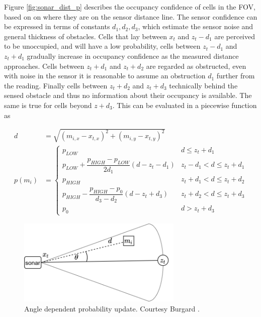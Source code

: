 Figure \ref{fig:sonar_dist_p} describes the occupancy confidence of cells in the FOV, based on on where they are on the sensor distance line. The sensor confidence can be expressed in terms of constants $d_1, d_2, d_3$, which estimate the sensor noise and general thickness of obstacles. Cells that lay between $x_t$ and $z_t-d_1$ are perceived to be unoccupied, and will have a low probability, cells between $z_t-d_1$ and $z_t+d_1$ gradually increase in occupancy confidence as the measured distance approaches. Cells between $z_t+d_1$ and $z_t+d_2$ are regarded as obstructed, even with noise in the sensor it is reasonable to assume an obstruction $d_1$ further from the reading. Finally cells between $z_t+d_2$ and $z_t+d_3$ technically behind the sensed obstacle and thus no information about their occupancy is available. The same is true for cells beyond $z+d_3$. This can be evaluated in a piecewise function as

\begin{align}
    d &= \sqrt{(m_{i,x} - x_{t,x})^2 + (m_{i,y} - x_{t,y})^2} \\
    p(m_i) &= \left\{ \begin{array}{ll}
        p_{LOW} & d \leq z_t + d_1 \\
        p_{LOW} + \dfrac{p_{HIGH} - p_{LOW}}{2d_1} (d - z_t - d_1) & z_t-d_1 < d \leq z_t+d_1  \\
        p_{HIGH} & z_t+d_1 < d \leq z_t+d_2 \\
        p_{HIGH} - \dfrac{p_{HIGH} - p_0}{d_3 - d_2} (d - z_t+d_3) & z_t+d_2 < d \leq z_t+d_3 \\
        p_0 & d > z_t + d_3
    \end{array}
    \right.
\end{align}

\begin{figure}
    \centering
    \includegraphics[width=0.7\textwidth]{figures/sonar_angle_p.png}
    \caption{Angle dependent probability update. Courtesy Burgard \cite{burgard_mr}.}
    \label{fig:sonar_angle_p}
\end{figure}


